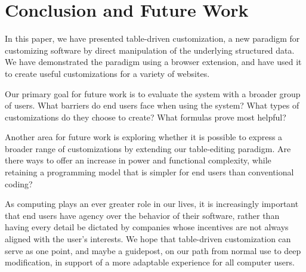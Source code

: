 \documentclass[sigplan,screen,10pt,anonymous,review]{acmart}
\begin{document}
\hypertarget{sec:conclusion}{%
\section{Conclusion and Future Work}\label{sec:conclusion}}

In this paper, we have presented table-driven customization, a new
paradigm for customizing software by direct manipulation of the
underlying structured data. We have demonstrated the paradigm using a
browser extension, and have used it to create useful customizations for
a variety of websites.

Our primary goal for future work is to evaluate the system with a
broader group of users. What barriers do end users face when using the
system? What types of customizations do they choose to create? What
formulas prove most helpful?

Another area for future work is exploring whether it is possible to
express a broader range of customizations by extending our table-editing
paradigm. Are there ways to offer an increase in power and functional
complexity, while retaining a programming model that is simpler for end
users than conventional coding?

As computing plays an ever greater role in our lives, it is increasingly
important that end users have agency over the behavior of their
software, rather than having every detail be dictated by companies whose
incentives are not always aligned with the user's interests. We hope
that table-driven customization can serve as one point, and maybe a
guidepost, on our path from normal use to deep modification, in support
of a more adaptable experience for all computer users.



\end{document}
